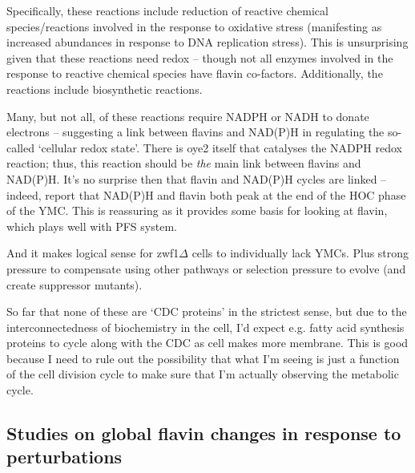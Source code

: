 Specifically, these reactions include reduction of reactive chemical species/reactions involved in the response to oxidative stress (manifesting as increased abundances in response to DNA replication stress).
This is unsurprising given that these reactions need redox -- though not all enzymes involved in the response to reactive chemical species have flavin co-factors.
Additionally, the reactions include biosynthetic reactions.

Many, but not all, of these reactions require NADPH or NADH to donate electrons -- suggesting a link between flavins and NAD(P)H in regulating the so-called `cellular redox state'.
There is oye2 itself that catalyses the NADPH redox reaction; thus, this reaction should be \emph{the} main link between flavins and NAD(P)H.
It's no surprise then that flavin and NAD(P)H cycles are linked -- indeed, \citet{murrayRedoxRegulationRespiring2011} report that NAD(P)H and flavin both peak at the end of the HOC phase of the YMC.
This is reassuring as it provides some basis for looking at flavin, which plays well with PFS system.

And it makes logical sense for zwf1$\Delta{}$ cells to individually lack YMCs. Plus strong pressure to compensate using other pathways or selection pressure to evolve (and create suppressor mutants).

So far that none of these are `CDC proteins' in the strictest sense, but due to the interconnectedness of biochemistry in the cell, I'd expect e.g. fatty acid synthesis proteins to cycle along with the CDC as cell makes more membrane.
This is good because I need to rule out the possibility that what I'm seeing is just a function of the cell division cycle to make sure that I'm actually observing the metabolic cycle.

\subsection{Studies on global flavin changes in response to perturbations}
\label{subsec:intro-flavin-perturbations}


